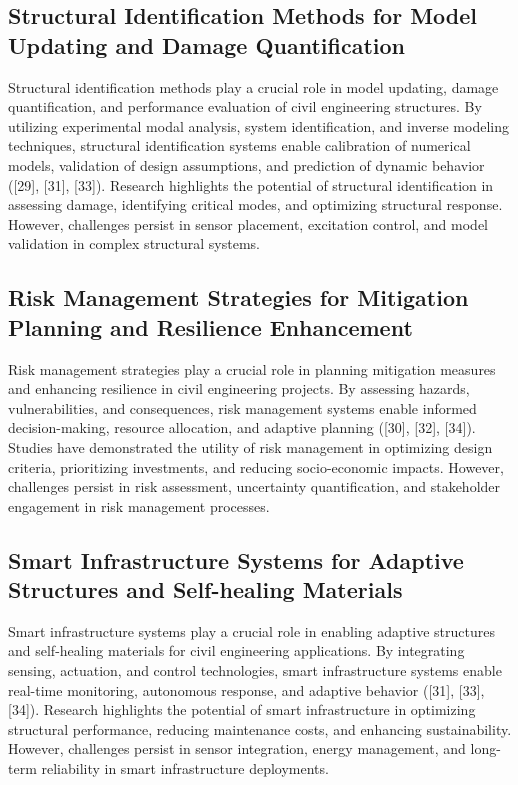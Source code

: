 \documentclass[journal, a4paper]{IEEEtran}
\begin{document}
\subsection{Structural Identification Methods for Model Updating and Damage Quantification}
Structural identification methods play a crucial role in model updating, damage quantification, and performance evaluation of
civil engineering structures. By utilizing experimental modal analysis, system identification, and inverse modeling techniques,
structural identification systems enable calibration of numerical models, validation of design assumptions, and prediction of
dynamic behavior ([29], [31], [33]). Research highlights the potential of structural identification in assessing damage,
identifying critical modes, and optimizing structural response. However, challenges persist in sensor placement,
excitation control, and model validation in complex structural systems.

\subsection{Risk Management Strategies for Mitigation Planning and Resilience Enhancement}
Risk management strategies play a crucial role in planning mitigation measures and enhancing resilience in civil
engineering projects. By assessing hazards, vulnerabilities, and consequences, risk management systems enable informed 
decision-making, resource allocation, and adaptive planning ([30], [32], [34]).
Studies have demonstrated the utility of risk management in optimizing design criteria,
prioritizing investments, and reducing socio-economic impacts. However, challenges persist in risk assessment,
uncertainty quantification, and stakeholder engagement in risk management processes.

\subsection{Smart Infrastructure Systems for Adaptive Structures and Self-healing Materials}
Smart infrastructure systems play a crucial role in enabling adaptive structures and self-healing
materials for civil engineering applications. By integrating sensing, actuation, and control technologies,
smart infrastructure systems enable real-time monitoring, autonomous response, and adaptive behavior ([31], [33], [34]).
Research highlights the potential of smart infrastructure in optimizing structural performance, reducing maintenance costs,
and enhancing sustainability. However, challenges persist in sensor integration, energy management, and long-term reliability
in smart infrastructure deployments.
\end{document}
